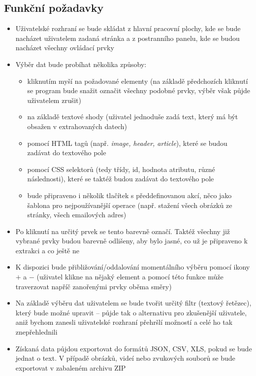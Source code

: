 \documentclass[thesis=B,czech]{FITthesis}[2012/06/26]
\begin{document}
\subsection{Funkční požadavky}
\begin{itemize}
	\item Uživatelské rozhraní se bude skládat z hlavní pracovní plochy, kde se bude nacházet uživatelem zadaná stránka a z postranního panelu, kde se budou nacházet všechny ovládací prvky
	\item Výběr dat bude probíhat několika způsoby:
	\begin{itemize}
		\item kliknutím myší na požadované elementy (na základě předchozích kliknutí se program bude snažit označit všechny podobné prvky, výběr však půjde uživatelem zrušit)
		\item na základě textové shody (uživatel jednoduše zadá text, který má být obsažen v extrahovaných datech)
		\item pomocí HTML tagů (např. \emph{image, header, article}), které se budou zadávat do textového pole
		\item pomocí CSS selektorů (tedy třídy, id, hodnota atributu, různé následnosti), které se taktéž budou zadávat do textového pole
		\item bude připraveno i několik tlačítek s předdefinovanou akcí, něco jako šablona pro nejpoužívanější operace (např. stažení všech obrázků ze stránky, všech emailových adres)
	\end{itemize}
	\item Po kliknutí na určitý prvek se tento barevně označí. Taktéž všechny již vybrané prvky budou barevně odlišeny, aby bylo jasné, co už je připraveno k extrakci a co ještě ne
	\item K dispozici bude přibližování/oddalování momentálního výběru pomocí ikony $+$ a $-$ (uživatel klikne na nějaký element a pomocí této funkce může traverzovat napříč zanořenými prvky oběma směry)
	\item Na základě výběru dat uživatelem se bude tvořit určitý filtr (textový řetězec), který bude možné upravit -- půjde tak o alternativu pro zkušenější uživatele, aniž bychom zanesli uživatelské rozhraní přehršlí možností a celé ho tak znepřehlednili
	\item Získaná data půjdou exportovat do formátů JSON, CSV, XLS, pokud se bude jednat o text. V případě obrázků, videí nebo zvukových souborů se bude exportovat v zabaleném archivu ZIP
\end{itemize}
\end{document}

